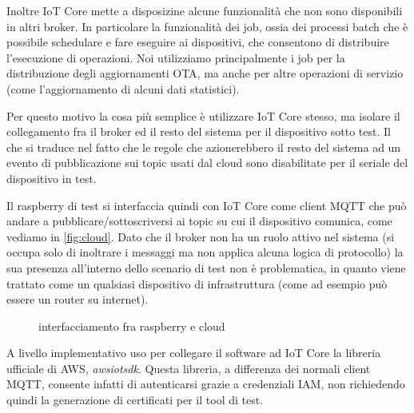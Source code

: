 \documentclass[12pt,a4paper,twoside,titlepage]{book}
\begin{document}
Inoltre IoT Core mette a disposizine alcune funzionalità che non sono disponibili in 
altri broker. In particolare la funzionalità dei job, ossia dei processi batch che è 
possibile schedulare e fare eseguire ai dispositivi, che consentono di distribuire l'esecuzione 
di operazioni. Noi utilizziamo principalmente i job per la distribuzione degli aggiornamenti OTA,
ma anche per altre operazioni di servizio (come l'aggiornamento di alcuni dati statistici). 

Per questo motivo la cosa più semplice è utilizzare IoT Core stesso, ma isolare il collegamento 
fra il broker ed il resto del sistema per il dispositivo sotto test. Il che si traduce nel 
fatto che le regole che azionerebbero il resto del sistema ad un evento di pubblicazione 
sui topic usati dal cloud sono disabilitate per il seriale del dispositivo in test. 

Il raspberry di test si interfaccia quindi con IoT Core come client MQTT che può 
andare a pubblicare/sottoscriversi ai topic su cui il dispositivo comunica, come vediamo in \autoref{fig:cloud}. 
Dato che il broker non ha un ruolo attivo nel sistema (si occupa solo di inoltrare i messaggi ma non 
applica alcuna logica di protocollo) la sua presenza all'interno dello scenario di test non 
è problematica, in quanto viene trattato come un qualsiasi dispositivo di infrastruttura 
(come ad esempio può essere un router su internet). 

\begin{figure}[h]
    \centering
    \caption{interfacciamento fra raspberry e cloud}
    \label{fig:cloud}
\end{figure}


A livello implementativo uso per collegare il software ad IoT Core
la libreria ufficiale di AWS, \textit{awsiotsdk}. Questa libreria, a differenza dei 
normali client MQTT, consente infatti di autenticarsi grazie a credenziali IAM, non 
richiedendo quindi la generazione di certificati per il tool di test. 
\end{document}
